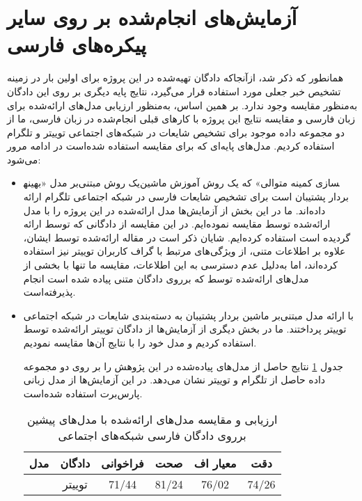 \section{آزمایش‌های انجام‌شده بر روی سایر پیکره‌های فارسی}
همانطور که ذکر شد، ازآنجاکه دادگان تهیه‌شده در این پروژه برای اولین بار در زمینه تشخیص خبر جعلی مورد استفاده قرار می‌گیرد، نتایج پایه دیگری بر روی این دادگان به‌منظور مقایسه وجود ندارد. بر همین اساس، به‌‌منظور ارزیابی مدل‌های ارائه‌شده برای زبان فارسی و مقایسه نتایج این پروژه با کارهای قبلی انجام‌شده در زبان فارسی، ما از دو مجموعه داده موجود برای تشخیص شایعات در شبکه‌های اجتماعی توییتر و تلگرام استفاده کردیم. مدل‌های پایه‌ای که برای مقایسه استفاده شده‌است در ادامه مرور می‌شود:
\begin{itemize}
\item
\cite{zamani2017rumor}
یک روش مبتنی‌بر مدل «بهینه‎سازی کمینه متوالی» که یک روش آموزش ماشین بردار پشتیبان است برای تشخیص شایعات فارسی در شبکه اجتماعی تلگرام ارائه داده‌اند. ما در این بخش از آزمایش‌ها مدل ارائه‌شده در این پروژه را با مدل ارائه‌شده توسط \cite{zamani2017rumor} مقایسه نموده‌ایم. در این مقایسه از دادگانی که توسط \cite{zamani2017rumor} ارائه گردیده است استفاده کرده‌ایم. شایان ذکر است در مقاله ارائه‌شده توسط ایشان، علاوه بر اطلاعات متنی، از ویژگی‌های مرتبط با گراف کاربران توییتر نیز استفاده کرده‌اند، اما به‌دلیل عدم دسترسی به این اطلاعات، مقایسه ما تنها با بخشی از مدل‌های ارائه‌شده توسط \cite{zamani2017rumor}  که برروی دادگان متنی پیاده شده است  انجام پذیرفته‌است.

\item
\citet{jahanbakhsh2020model}
با ارائه مدل مبتنی‌بر ماشین بردار پشتیبان به دسته‌بندی شایعات در شبکه اجتماعی توییتر پرداختند. ما در بخش دیگری از آزمایش‌ها از دادگان توییتر ارائه‌شده توسط \citet{jahanbakhsh2020model} استفاده کردیم و مدل خود را با نتایج آن‌ها مقایسه نمودیم.

جدول \ref{table.comparison} نتایج حاصل از مدل‌های پیاده‌شده در این پژوهش را بر روی دو مجموعه داده حاصل از تلگرام و توییتر نشان می‌دهد. در این آزمایش‌ها از مدل زبانی پارس‌برت استفاده شده‌است.


\begin{table}
	\caption{ارزیابی و مقایسه مدل‌های ارائه‌شده با مدل‌های پیشین برروی دادگان فارسی شبکه‌های اجتماعی}
	\label{table.comparison}
	\begin{center}
		\begin{tabular}{|c|c|c|c|c|c|}
			\hline
			مدل & دادگان & فراخوانی & صحت & معیار اف & دقت \\
			\hline
			\citep{zamani2017rumor} & 
			\multirow{4}{*}{توییتر} & 71/44 & 81/24 & 76/02 & 74/26 \\
			

\end{tabular}
\end{center}
\end{table}
\end{itemize}

